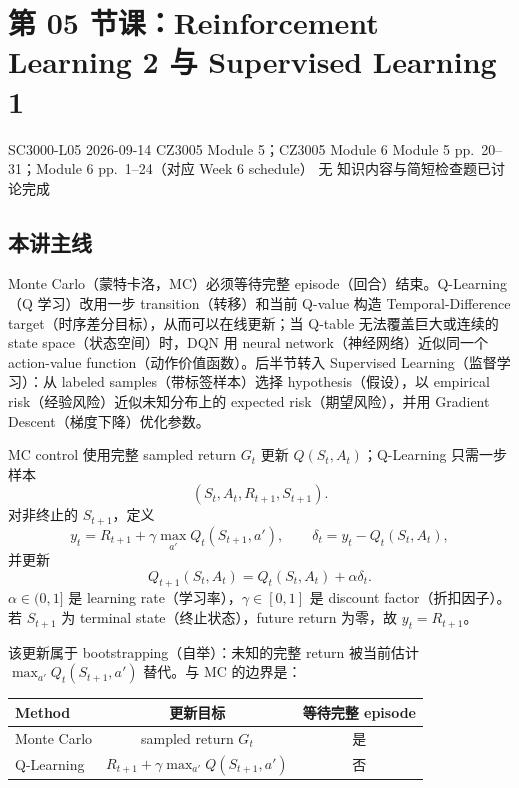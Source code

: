 
\section{第 05 节课：Reinforcement Learning 2 与 Supervised Learning 1}
\label{lecture:SC3000-L05}

\lecturemeta
  {SC3000-L05}
  {2026-09-14}
  {CZ3005 Module 5；CZ3005 Module 6}
  {Module 5 pp.~20--31；Module 6 pp.~1--24（对应 Week 6 schedule）}
  {无}
  {知识内容与简短检查题已讨论完成}

\subsection{本讲主线}

Monte Carlo（蒙特卡洛，MC）必须等待完整 episode（回合）结束。Q-Learning（Q 学习）改用一步 transition（转移）和当前 Q-value 构造 Temporal-Difference target（时序差分目标），从而可以在线更新；当 Q-table 无法覆盖巨大或连续的 state space（状态空间）时，DQN 用 neural network（神经网络）近似同一个 action-value function（动作价值函数）。后半节转入 Supervised Learning（监督学习）：从 labeled samples（带标签样本）选择 hypothesis（假设），以 empirical risk（经验风险）近似未知分布上的 expected risk（期望风险），并用 Gradient Descent（梯度下降）优化参数。


MC control 使用完整 sampled return $G_t$ 更新 $Q(S_t,A_t)$；Q-Learning 只需一步样本
\[
  (S_t,A_t,R_{t+1},S_{t+1}).
\]
对非终止的 $S_{t+1}$，定义
\[
  y_t=R_{t+1}+\gamma\max_{a'}Q_t(S_{t+1},a'),
  \qquad
  \delta_t=y_t-Q_t(S_t,A_t),
\]
并更新
\[
  \boxed{
  Q_{t+1}(S_t,A_t)
  =Q_t(S_t,A_t)+\alpha\delta_t}.
\]
$\alpha\in(0,1]$ 是 learning rate（学习率），$\gamma\in[0,1]$ 是 discount factor（折扣因子）。若 $S_{t+1}$ 为 terminal state（终止状态），future return 为零，故 $y_t=R_{t+1}$。

该更新属于 bootstrapping（自举）：未知的完整 return 被当前估计 $\max_{a'}Q_t(S_{t+1},a')$ 替代。与 MC 的边界是：
\begin{center}
\begin{tabular}{@{}lcc@{}}
  \toprule
  Method & 更新目标 & 等待完整 episode \\
  \midrule
  Monte Carlo & sampled return $G_t$ & 是 \\
  Q-Learning & $R_{t+1}+\gamma\max_{a'}Q(S_{t+1},a')$ & 否 \\
  \bottomrule
\end{tabular}
\end{center}

